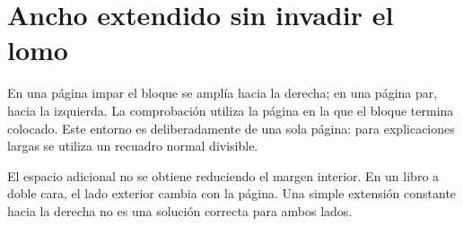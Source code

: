 \section{Ancho extendido sin invadir el lomo}
\begin{fullwidth}
\begin{insightbox}
En una página impar el bloque se amplía hacia la derecha; en una página par, hacia la izquierda. La comprobación utiliza la página en la que el bloque termina colocado. Este entorno es deliberadamente de una sola página: para explicaciones largas se utiliza un recuadro normal divisible.
\end{insightbox}
\end{fullwidth}

El espacio adicional no se obtiene reduciendo el margen interior. En un libro a doble cara, el lado exterior cambia con la página. Una simple extensión constante hacia la derecha no es una solución correcta para ambos lados.
